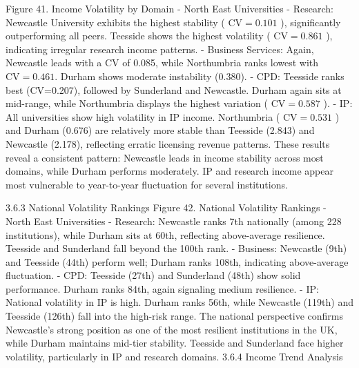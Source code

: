 Figure 41. Income Volatility by Domain - North East Universities
- Research: Newcastle University exhibits the highest stability ( $\mathrm{CV}=0.101$ ), significantly outperforming all peers. Teesside shows the highest volatility ( $\mathrm{CV}=0.861$ ), indicating irregular research income patterns.
- Business Services: Again, Newcastle leads with a CV of 0.085, while Northumbria ranks lowest with $\mathrm{CV}=0.461$. Durham shows moderate instability (0.380).
- CPD: Teesside ranks best (CV=0.207), followed by Sunderland and Newcastle. Durham again sits at mid-range, while Northumbria displays the highest variation ( $\mathrm{CV}=0.587$ ).
- IP: All universities show high volatility in IP income. Northumbria ( $\mathrm{CV}=0.531$ ) and Durham (0.676) are relatively more stable than Teesside (2.843) and Newcastle (2.178), reflecting erratic licensing revenue patterns.
These results reveal a consistent pattern: Newcastle leads in income stability across most domains, while Durham performs moderately. IP and research income appear most vulnerable to year-to-year fluctuation for several institutions.

3.6.3 National Volatility Rankings
Figure 42. National Volatility Rankings - North East Universities
- Research: Newcastle ranks 7th nationally (among 228 institutions), while Durham sits at 60th, reflecting above-average resilience. Teesside and Sunderland fall beyond the 100th rank.
- Business: Newcastle (9th) and Teesside (44th) perform well; Durham ranks 108th, indicating above-average fluctuation.
- CPD: Teesside (27th) and Sunderland (48th) show solid performance. Durham ranks 84th, again signaling medium resilience.
- IP: National volatility in IP is high. Durham ranks 56th, while Newcastle (119th) and Teesside (126th) fall into the high-risk range.
The national perspective confirms Newcastle's strong position as one of the most resilient institutions in the UK, while Durham maintains mid-tier stability. Teesside and Sunderland face higher volatility, particularly in IP and research domains.
3.6.4 Income Trend Analysis

